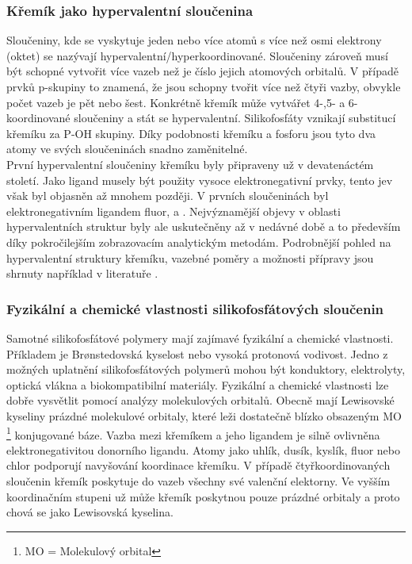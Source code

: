 \documentclass[
  digital, %
  table,   %
  lof,     %
  lot,     %
]{fithesis3}
\begin{document}
\subsubsection{Křemík jako hypervalentní sloučenina}\label{teorie_hypervalence}
Sloučeniny, kde se vyskytuje jeden nebo více atomů s více než osmi elektrony (oktet) se nazývají hypervalentní/hyperkoordinované. Sloučeniny zároveň musí být schopné vytvořit více vazeb než je číslo jejich atomových orbitalů. V případě prvků p-skupiny to znamená, že jsou schopny tvořit více než čtyři vazby, obvykle počet vazeb je pět nebo šest. Konkrétně křemík může vytvářet 4-,5- a 6- koordinované sloučeniny a stát se hypervalentní. Silikofosfáty vznikají substitucí křemíku za P-OH skupiny. Díky podobnosti křemíku a fosforu jsou tyto dva atomy ve svých sloučeninách snadno zaměnitelné. \\

První hypervalentní sloučeniny křemíku byly připraveny už v devatenáctém století. Jako ligand musely být použity vysoce elektronegativní prvky, tento jev však byl objasněn až mnohem později. V prvních sloučeninách byl elektronegativním ligandem fluor,  a . Nejvýznamější objevy v oblasti hypervalentních struktur byly ale uskutečněny až v nedávné době a to především díky pokročilejším zobrazovacím analytickým metodám. Podrobnější pohled na hypervalentní struktury křemíku, vazebné poměry a možnosti přípravy jsou shrnuty například v literatuře \cite{Wagler2014}.\\

\subsubsection{Fyzikální a chemické vlastnosti silikofosfátových sloučenin}
Samotné silikofosfátové polymery mají zajímavé fyzikální a chemické vlastnosti. Příkladem je Brønstedovská kyselost nebo vysoká protonová vodivost. Jedno z možných uplatnění silikofosfátových polymerů mohou být konduktory, elektrolyty, optická vlákna a biokompatibilní materiály. Fyzikální a chemické vlastnosti lze dobře vysvětlit pomocí analýzy molekulových orbitalů. Obecně mají Lewisovské kyseliny prázdné molekulové orbitaly, které leži dostatečně blízko obsazeným MO \footnote{MO = Molekulový orbital} konjugované báze. Vazba mezi křemíkem a jeho ligandem je silně ovlivněna elektronegativitou donorního ligandu. Atomy jako uhlík, dusík, kyslík, fluor nebo chlor podporují navyšování koordinace křemíku. V případě čtyřkoordinovaných sloučenin křemík poskytuje do vazeb všechny své valenční elektorny. Ve vyšším koordinačním stupeni už může křemík poskytnou pouze prázdné orbitaly a proto chová se jako Lewisovská kyselina.\\
\end{document}
